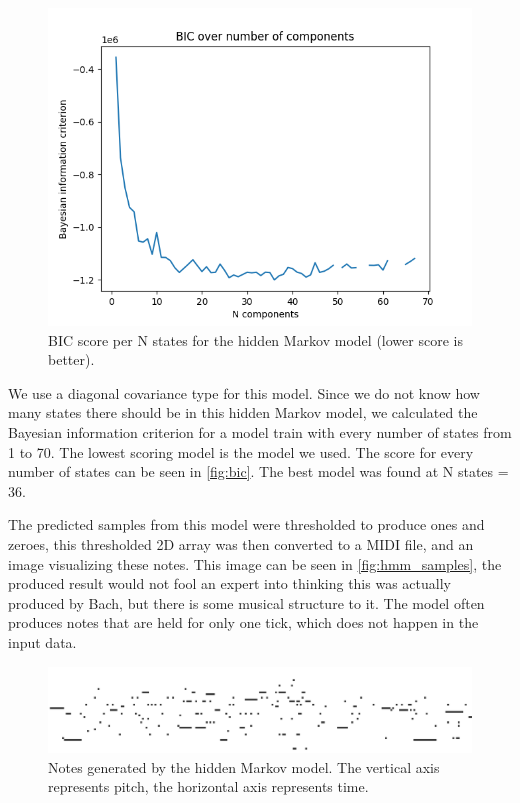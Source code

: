 \documentclass[11pt, twocolumn]{article}
\begin{document}
\begin{figure}[ht]
    \centering
    \includegraphics[width=\linewidth]{images/hmm_unfin_bic.png}
    \caption{BIC score per N states for the hidden Markov model (lower score is better).}
    \label{fig:bic}
\end{figure}

We use a diagonal covariance type for this model. Since we do not know how many states there should be in this hidden Markov model, we calculated the Bayesian information criterion for a model train with every number of states from 1 to 70. The lowest scoring model is the model we used. The score for every number of states can be seen in \autoref{fig:bic}. The best model was found at N states = 36.

The predicted samples from this model were thresholded to produce ones and zeroes, this thresholded 2D array was then converted to a MIDI file, and an image visualizing these notes. This image can be seen in \autoref{fig:hmm_samples}, the produced result would not fool an expert into thinking this was actually produced by Bach, but there is some musical structure to it. The model often produces notes that are held for only one tick, which does not happen in the input data.


\begin{figure}[ht]
    \centering
    \includegraphics[width=\linewidth]{images/hmm_samples.png}
    \caption{Notes generated by the hidden Markov model. The vertical axis represents pitch, the horizontal axis represents time.}
    \label{fig:hmm_samples}
\end{figure}
\end{document}
